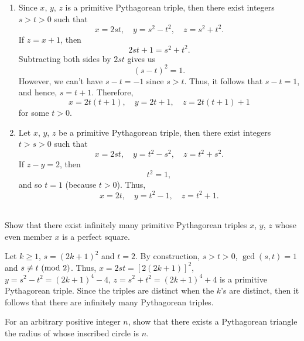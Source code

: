 \begin{solution}
    \begin{enumerate}
        \item Since $x$, $y$, $z$ is a primitive Pythagorean triple, then there exist integers $s > t > 0$ such that
        $$x = 2st, \quad y = s^2 - t^2, \quad z = s^2 + t^2.$$
        If $z = x +1$, then
        $$2st + 1= s^2 + t^2.$$
        Subtracting both sides by $2st$ gives us
        $$(s-t)^2 = 1.$$
        However, we can't have $s - t = -1$ since $s > t$. Thus, it follows that $s - t = 1$, and hence, $s = t + 1$. Therefore, 
        $$x = 2t(t+1), \quad y = 2t + 1, \quad z = 2t(t+1) + 1$$
        for some $t > 0$.
        \item Let $x$, $y$, $z$ be a primitive Pythagorean triple, then there exist integers $t > s > 0$ such that
        $$x = 2st, \quad y = t^2 - s^2, \quad z = t^2 + s^2.$$
        If $z - y = 2$, then 
        $$t^2 = 1,$$
        and so $t = 1$ (because $t > 0$). Thus,
        $$x = 2t, \quad y = t^2 - 1, \quad z = t^2 + 1.$$ \\
    \end{enumerate}
\end{solution}

\begin{exercise}
    Show that there exist infinitely many primitive Pythagorean triples $x$, $y$, $z$ whose even member $x$ is a perfect square.  \\
\end{exercise}

\begin{solution}
    Let $k \geq 1$, $s = (2k + 1)^2$ and $t = 2$. By construction, $s > t > 0$, $\gcd(s,t) = 1$ and $s \not\equiv t \ (\mathrm{mod}\ 2)$. Thus, $x = 2st = [2(2k+1)]^2$, $y = s^2 - t^2 = (2k + 1)^4 - 4$, $z = s^2 + t^2 = (2k + 1)^4 + 4$ is a primitive Pythagorean triple. Since the triples are distinct when the $k$'s are distinct, then it follows that there are infinitely many Pythagorean triples. \\
\end{solution}

\begin{exercise}
    For an arbitrary positive integer $n$, show that there exists a Pythagorean triangle the radius of whose inscribed circle is $n$.  \\
\end{exercise}

